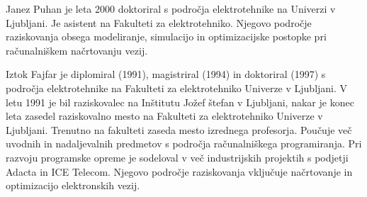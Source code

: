 \documentclass[journal,a4paper,twoside]{template/IEEEtran}
\begin{document}

\begin{IEEEbiographynophoto}{Janez Puhan} je leta 2000 doktoriral s področja elektrotehnike na Univerzi v Ljubljani. Je asistent na Fakulteti za elektrotehniko. Njegovo področje raziskovanja obsega modeliranje, simulacijo in optimizacijske postopke pri računalniškem načrtovanju vezij.
\end{IEEEbiographynophoto}

\begin{IEEEbiographynophoto}{Iztok Fajfar} je diplomiral (1991), magistriral (1994) in doktoriral (1997) s področja elektrotehnike na Fakulteti za elektrotehniko Univerze v Ljubljani. V letu 1991 je bil raziskovalec na Inštitutu Jožef štefan v Ljubljani, nakar je konec leta zasedel raziskovalno mesto na Fakulteti za elektrotehniko Univerze v Ljubljani. 
Trenutno na fakulteti zaseda mesto izrednega profesorja. Poučuje več uvodnih in nadaljevalnih predmetov s področja računalniškega programiranja. Pri razvoju programske opreme je sodeloval v več industrijskih projektih s podjetji Adacta in ICE Telecom. Njegovo področje raziskovanja vključuje načrtovanje in optimizacijo elektronskih vezij.
\end{IEEEbiographynophoto}
\end{document}
